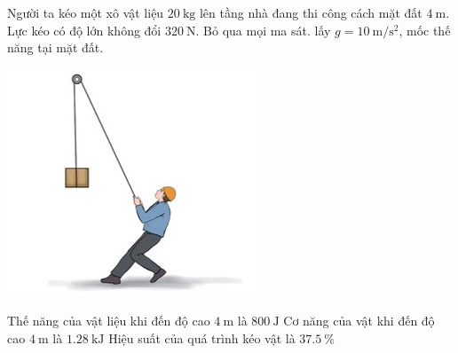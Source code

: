 \begin{ex}
	Người ta kéo một xô vật liệu $\SI{20}{\kilogram}$ lên tầng nhà đang thi công cách mặt đất $\SI{4}{\meter}$. Lực kéo có độ lớn không đổi $\SI{320}{\newton}$. Bỏ qua mọi ma sát. lấy $g=\SI{10}{\meter/\second^2}$, mốc thế năng tại mặt đất.
	\begin{center}
		\includegraphics[width=0.4\linewidth]{../figs/VN10-2022-PH-TP028-2}
	\end{center}
	{\True Thế năng của vật liệu khi đến độ cao $\SI{4}{\meter}$ là $\SI{800}{\joule}$}
	{\True Cơ năng của vật khi đến độ cao $\SI{4}{\meter}$ là $\SI{1.28}{\kilo\joule}$}
	{Hiệu suất của quá trình kéo vật là $\SI{37.5}{\percent}$}
\end{ex}
